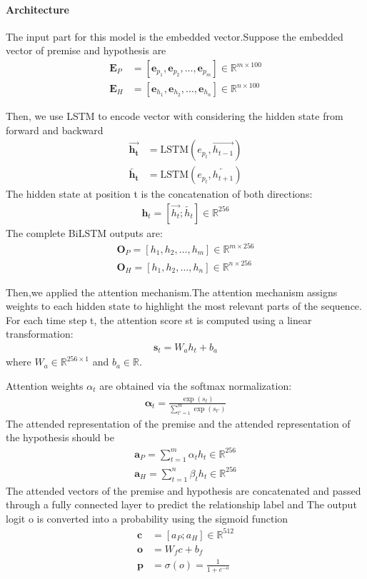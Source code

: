\documentclass[11pt]{article}
\begin{document}
\paragraph{Architecture}The input part for this model is the embedded vector.Suppose the embedded vector of premise and hypothesis are 
\begin{align}
\mathbf{E}_P &= [\mathbf{e}_{p_1}, \mathbf{e}_{p_2}, \dots, \mathbf{e}_{p_m}] \in \mathbb{R}^{m \times 100} \\
\mathbf{E}_H &= [\mathbf{e}_{h_1}, \mathbf{e}_{h_2}, \dots, \mathbf{e}_{h_n}] \in \mathbb{R}^{n \times 100}
\end{align}

Then, we use LSTM to encode vector with considering the hidden state from forward and backward
\begin{align} 
\overrightarrow{\mathbf{h_t}} &= \text{LSTM}(e_{p_t}, \overrightarrow{h_{t-1}})\\ 
\overleftarrow{\mathbf{h_t}} &= \text{LSTM}(e_{p_t}, \overleftarrow{h_{t+1}}) 
\end{align}
The hidden state at position t is the concatenation of both directions:
\begin{align} 
\mathbf h_t = [\overrightarrow{h_t}; \overleftarrow{h_t}] \in \mathbb{R}^{256}
\end{align}
The complete BiLSTM outputs are:
\begin{align} 
\mathbf O_P = [h_1, h_2, \dots, h_m] \in \mathbb{R}^{m \times 256}\\
\mathbf O_H = [h_1, h_2, \dots, h_n] \in \mathbb{R}^{n \times 256}
\end{align}

Then,we applied the attention mechanism.The attention mechanism assigns weights to each hidden state to highlight the most relevant parts of the sequence. For each time step t, the attention score st is computed using a linear transformation:
\begin{align} 
\mathbf s_t = W_a h_t + b_a
\end{align}
where $W_a \in \mathbb{R}^{256 \times 1}$ and $b_a \in \mathbb{R}$.

Attention weights $\alpha_t$ are obtained via the softmax normalization:
\begin{align} 
\mathbf \alpha_t = \frac{\exp(s_t)}{\sum_{t'=1}^{m} \exp(s_{t'})}
\end{align}
The attended representation of the premise and the attended representation of the hypothesis should be 
\begin{align} 
\mathbf a_P = \sum_{t=1}^{m} \alpha_t h_t \in \mathbb{R}^{256}\\
\mathbf a_H = \sum_{t=1}^{n} \beta_t h_t \in \mathbb{R}^{256}
\end{align}
The attended vectors of the premise and hypothesis are concatenated and passed through
a fully connected layer to predict the relationship label and The output logit o is converted into a probability using the sigmoid function
\begin{align} 
\mathbf c &= [a_P; a_H] \in \mathbb{R}^{512} \\
\mathbf o &= W_f c + b_f \\
\mathbf p &= \sigma(o) = \frac{1}{1 + e^{-o}}
\end{align}
\end{document}
